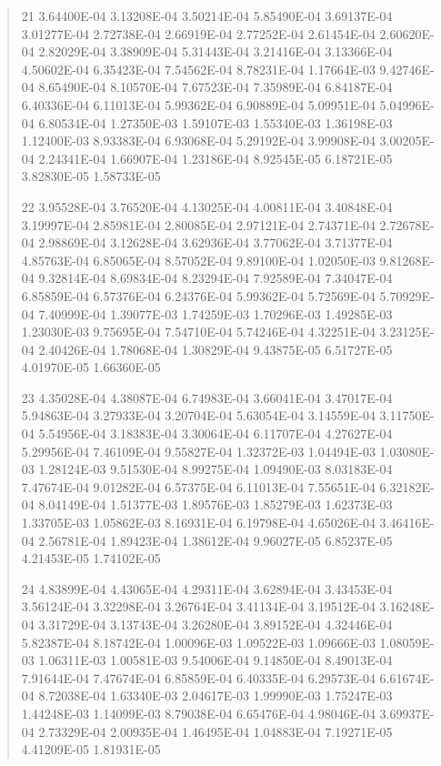 \documentclass[letterpaper,10pt,english]{sphinxmanual}
\begin{document}
\begin{quote}
\begin{DUlineblock}{0em}
\item[] 21   3.64400E-04  3.13208E-04  3.50214E-04  5.85490E-04  3.69137E-04  3.01277E-04  2.72738E-04  2.66919E-04  2.77252E-04  2.61454E-04  2.60620E-04  2.82029E-04  3.38909E-04  5.31443E-04  3.21416E-04  3.13366E-04  4.50602E-04  6.35423E-04  7.54562E-04  8.78231E-04  1.17664E-03  9.42746E-04  8.65490E-04  8.10570E-04  7.67523E-04  7.35989E-04  6.84187E-04  6.40336E-04  6.11013E-04  5.99362E-04  6.90889E-04  5.09951E-04  5.04996E-04  6.80534E-04  1.27350E-03  1.59107E-03  1.55340E-03  1.36198E-03  1.12400E-03  8.93383E-04  6.93068E-04  5.29192E-04  3.99908E-04  3.00205E-04  2.24341E-04  1.66907E-04  1.23186E-04  8.92545E-05  6.18721E-05  3.82830E-05  1.58733E-05
\item[] 22   3.95528E-04  3.76520E-04  4.13025E-04  4.00811E-04  3.40848E-04  3.19997E-04  2.85981E-04  2.80085E-04  2.97121E-04  2.74371E-04  2.72678E-04  2.98869E-04  3.12628E-04  3.62936E-04  3.77062E-04  3.71377E-04  4.85763E-04  6.85065E-04  8.57052E-04  9.89100E-04  1.02050E-03  9.81268E-04  9.32814E-04  8.69834E-04  8.23294E-04  7.92589E-04  7.34047E-04  6.85859E-04  6.57376E-04  6.24376E-04  5.99362E-04  5.72569E-04  5.70929E-04  7.40999E-04  1.39077E-03  1.74259E-03  1.70296E-03  1.49285E-03  1.23030E-03  9.75695E-04  7.54710E-04  5.74246E-04  4.32251E-04  3.23125E-04  2.40426E-04  1.78068E-04  1.30829E-04  9.43875E-05  6.51727E-05  4.01970E-05  1.66360E-05
\item[] 23   4.35028E-04  4.38087E-04  6.74983E-04  3.66041E-04  3.47017E-04  5.94863E-04  3.27933E-04  3.20704E-04  5.63054E-04  3.14559E-04  3.11750E-04  5.54956E-04  3.18383E-04  3.30064E-04  6.11707E-04  4.27627E-04  5.29956E-04  7.46109E-04  9.55827E-04  1.32372E-03  1.04494E-03  1.03080E-03  1.28124E-03  9.51530E-04  8.99275E-04  1.09490E-03  8.03183E-04  7.47674E-04  9.01282E-04  6.57375E-04  6.11013E-04  7.55651E-04  6.32182E-04  8.04149E-04  1.51377E-03  1.89576E-03  1.85279E-03  1.62373E-03  1.33705E-03  1.05862E-03  8.16931E-04  6.19798E-04  4.65026E-04  3.46416E-04  2.56781E-04  1.89423E-04  1.38612E-04  9.96027E-05  6.85237E-05  4.21453E-05  1.74102E-05
\item[] 24   4.83899E-04  4.43065E-04  4.29311E-04  3.62894E-04  3.43453E-04  3.56124E-04  3.32298E-04  3.26764E-04  3.41134E-04  3.19512E-04  3.16248E-04  3.31729E-04  3.13743E-04  3.26280E-04  3.89152E-04  4.32446E-04  5.82387E-04  8.18742E-04  1.00096E-03  1.09522E-03  1.09666E-03  1.08059E-03  1.06311E-03  1.00581E-03  9.54006E-04  9.14850E-04  8.49013E-04  7.91644E-04  7.47674E-04  6.85859E-04  6.40335E-04  6.29573E-04  6.61674E-04  8.72038E-04  1.63340E-03  2.04617E-03  1.99990E-03  1.75247E-03  1.44248E-03  1.14099E-03  8.79038E-04  6.65476E-04  4.98046E-04  3.69937E-04  2.73329E-04  2.00935E-04  1.46495E-04  1.04883E-04  7.19271E-05  4.41209E-05  1.81931E-05

\end{DUlineblock}
\end{quote}
\end{document}
